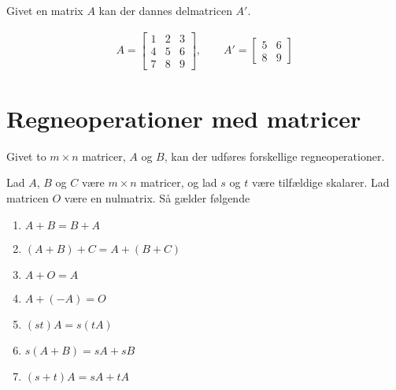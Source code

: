 Givet en matrix $A$ kan der dannes delmatricen $A'$.

\begin{align*}
A = \begin{bmatrix}
	1 & 2 & 3 \\
	4 & 5 & 6 \\
	7 & 8 & 9 
\end{bmatrix}, \quad \quad
A' = \begin{bmatrix}
	5 & 6 \\
	8 & 9
\end{bmatrix}
\end{align*}

\section{Regneoperationer med matricer}
Givet to $m \times n$ matricer, $A$ og $B$, kan der udføres forskellige regneoperationer. \\

\begin{stn}
Lad $A$, $B$ og $C$ være $m \times n$ matricer, og lad $s$ og $t$ være tilfældige skalarer. Lad matricen $O$ være en nulmatrix.
Så gælder følgende
\begin{enumerate}[label=(\alph*)]
\item $A + B = B + A$
\item $(A + B) + C = A + (B + C)$
\item $A + O = A$
\item $A + (-A) = O$
\item $(st) A = s (tA)$
\item $s(A + B) = sA + sB$
\item $(s+t)A = sA + tA$
\end{enumerate}
\label{stn_regn}
\end{stn}

